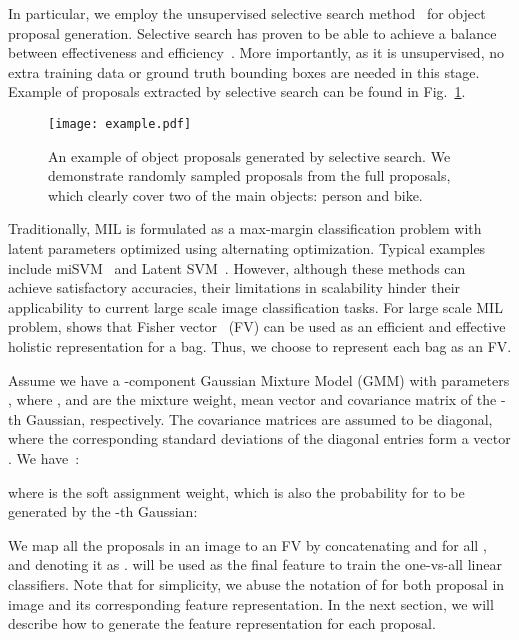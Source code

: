 \documentclass[10pt,twocolumn,letterpaper]{article}
\begin{document}
In particular, we employ the unsupervised selective search
method~\cite{Uijlings2013} for object proposal generation.
Selective search has proven to be able to achieve a balance
between effectiveness and efficiency~\cite{Hosang2014}. More
importantly, as it is unsupervised, no extra training data or
ground truth bounding boxes are needed in this stage. Example of
proposals extracted by selective search can be found in
Fig.~\ref{selective-search}.

\begin{figure}
 \centering
 \texttt{[image: example.pdf]}
 \caption{An example of object proposals generated by selective search. We demonstrate  randomly sampled proposals from the full  proposals, which clearly cover two of the main objects: person and bike.}
 \label{selective-search}
\end{figure}

Traditionally, MIL is formulated as a max-margin classification
problem with latent parameters optimized using alternating
optimization. Typical examples include miSVM~\cite{Andrews2003}
and Latent SVM~\cite{Felzenszwalb2010}. However, although these
methods can achieve satisfactory accuracies, their limitations in
scalability hinder their applicability to current large scale
image classification tasks. For large scale MIL problem,
\cite{Wu2014} shows that Fisher
vector~\cite{Perronnin2010,Sanchez2013} (FV) can be used as an
efficient and effective holistic representation for a bag.
Thus, we choose to represent each bag  as an FV.

Assume we have a -component Gaussian Mixture Model (GMM) with
parameters , where ,  and  are
the mixture weight, mean vector and covariance matrix of the
-th Gaussian, respectively. The covariance matrices 
are assumed to be diagonal, where the corresponding standard
deviations of the diagonal entries form a vector .
We have~\cite{Sanchez2013}:

where  is the soft assignment weight, which is also
the probability for  to be generated by the -th
Gaussian:


We map all the proposals  in an
image  to an FV by concatenating
 and 
for all , and denoting it as .
 will be used as the final feature to train the
one-vs-all linear classifiers. Note that for simplicity, we abuse
the notation of  for both proposal  in image 
and its corresponding feature representation. In the next section,
we will describe how to generate the feature representation
 for each proposal.
\end{document}

